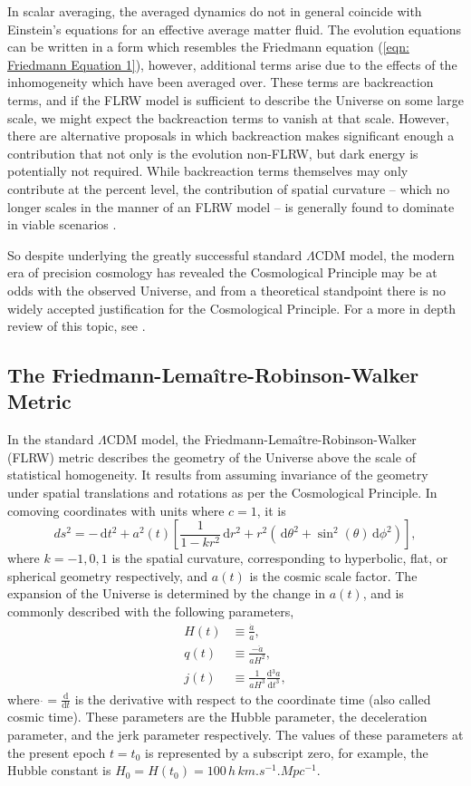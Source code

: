 \documentclass[a4paper,12pt]{report}
\newcommand{\diff}[1]{\,\text{d}{#1}}
\newcommand{\deriv}[2]{\frac{\text{d}{#1}}{\text{d}{#2}}}
\begin{document}
In scalar averaging, the averaged dynamics do not in general coincide with Einstein's equations for an effective average matter fluid. The evolution equations can be written in a form which resembles the Friedmann equation (\ref{eqn: Friedmann Equation 1}), however, additional terms arise due to the effects of the inhomogeneity which have been averaged over. These terms are backreaction terms, and if the FLRW model is sufficient to describe the Universe on some large scale, we might expect the backreaction terms to vanish at that scale. However, there are alternative proposals in which backreaction makes significant enough a contribution that not only is the evolution non-FLRW, but dark energy is potentially not required. While backreaction terms themselves may only contribute at the percent level, the contribution of spatial curvature -- which no longer scales in the manner of an FLRW model -- is generally found to dominate in viable scenarios \cite{RN226,RN227,RN154,RN229,RN230,RN231}.

So despite underlying the greatly successful standard $\Lambda$CDM model, the modern era of precision cosmology has revealed the Cosmological Principle may be at odds with the observed Universe, and from a theoretical standpoint there is no widely accepted justification for the Cosmological Principle. For a more in depth review of this topic, see \cite{RN194}.


\subsection{The Friedmann-Lemaître-Robinson-Walker Metric}
In the standard $\Lambda$CDM model, the Friedmann-Lemaître-Robinson-Walker (FLRW) metric describes the geometry of the Universe above the scale of statistical homogeneity. It results from assuming invariance of the geometry under spatial translations and rotations as per the Cosmological Principle. In comoving coordinates with units where $c=1$, it is
\begin{equation}\label{eqn: FLRW metric}
  ds^2 = -\diff{t}^2 + a^2(t)\left[\frac{1}{1-kr^2}\diff{r}^2 + r^2\left(\diff{\theta}^2+\sin^2(\theta)\diff{\phi}^2\right)\right],
\end{equation}
where $k=-1,0,1$ is the spatial curvature, corresponding to hyperbolic, flat, or spherical geometry respectively, and $a(t)$ is the cosmic scale factor. The expansion of the Universe is determined by the change in $a(t)$, and is commonly described with the following parameters,
\begin{align}
  H(t) &\equiv \frac{\dot{a}}{a},\\
  q(t) &\equiv \frac{-\ddot{a}}{aH^2},\\
  j(t) &\equiv \frac{1}{aH^3}\deriv{^3 a}{t^3},
\end{align}
where $\dot{}=\deriv{}{t}$ is the derivative with respect to the coordinate time (also called cosmic time). These parameters are the Hubble parameter, the deceleration parameter, and the jerk parameter respectively. The values of these parameters at the present epoch $t=t_0$ is represented by a subscript zero, for example, the Hubble constant is $H_0 = H(t_0) = 100\, h\, \si{km.s^{-1}.Mpc^{-1}}$.
\end{document}
